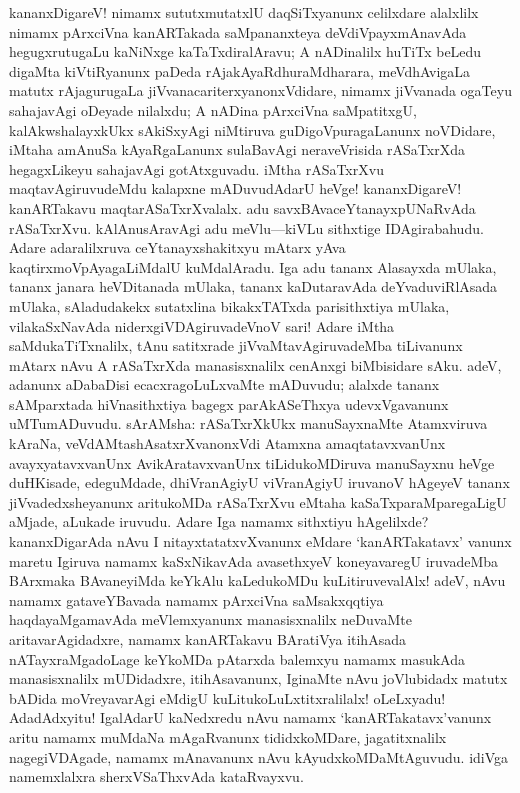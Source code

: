 \documentclass[11pt,a4size]{article}
\begin{document}
kananxDigareV! nimamx sututxmutatxlU daqSiTxyanunx celilxdare
alalxlilx nimamx pArxciVna kanARTakada saMpananxteya
deVdiVpayxmAnavAda hegugxrutugaLu kaNiNxge kaTaTxdiralAravu; A
nADinalilx huTiTx beLedu digaMta kiVtiRyanunx paDeda
rAjakAyaRdhuraMdharara, meVdhAvigaLa matutx rAjagurugaLa
jiVvanacariterxyanonxVdidare, nimamx jiVvanada ogaTeyu sahajavAgi
oDeyade nilalxdu; A nADina pArxciVna saMpatitxgU, kalAkwshalayxkUkx
sAkiSxyAgi niMtiruva guDigoVpuragaLanunx noVDidare, iMtaha amAnuSa
kAyaRgaLanunx sulaBavAgi neraveVrisida rASaTxrXda hegagxLikeyu
sahajavAgi gotAtxguvadu. iMtha rASaTxrXvu maqtavAgiruvudeMdu kalapxne
mADuvudAdarU heVge! kananxDigareV! kanARTakavu
maqtarASaTxrXvalalx. adu savxBAvaceYtanayxpUNaRvAda
rASaTxrXvu. kAlAnusAravAgi adu meVlu---kiVLu sithxtige
IDAgirabahudu. Adare adaralilxruva ceYtanayxshakitxyu mAtarx yAva
kaqtirxmoVpAyagaLiMdalU kuMdalAradu. Iga adu tananx Alasayxda mUlaka,
tananx janara heVDitanada mUlaka, tananx kaDutaravAda deYvaduviRlAsada
mUlaka, sAladudakekx sutatxlina bikakxTATxda parisithxtiya mUlaka,
vilakaSxNavAda niderxgiVDAgiruvadeVnoV sari! Adare iMtha
saMdukaTiTxnalilx, tAnu satitxrade jiVvaMtavAgiruvadeMba tiLivanunx
mAtarx nAvu A rASaTxrXda manasisxnalilx cenAnxgi biMbisidare
sAku. adeV, adanunx aDabaDisi ecacxragoLuLxvaMte mADuvudu; alalxde
tananx sAMparxtada hiVnasithxtiya bagegx parAkASeThxya udevxVgavanunx
uMTumADuvudu. sArAMsha: rASaTxrXkUkx manuSayxnaMte Atamxviruva kAraNa,
veVdAMtashAsatxrXvanonxVdi Atamxna amaqtatavxvanUnx avayxyatavxvanUnx
AvikAratavxvanUnx tiLidukoMDiruva manuSayxnu heVge duHKisade,
edeguMdade, dhiVranAgiyU viVranAgiyU iruvanoV hAgeyeV tananx
jiVvadedxsheyanunx aritukoMDa rASaTxrXvu eMtaha kaSaTxparaMparegaLigU
aMjade, aLukade iruvudu. Adare Iga namamx sithxtiyu hAgelilxde?
kananxDigarAda nAvu I nitayxtatatxvXvanunx eMdare `kanARTakatavx'
vanunx maretu Igiruva namamx kaSxNikavAda avasethxyeV koneyavaregU
iruvadeMba BArxmaka BAvaneyiMda keYkAlu kaLedukoMDu kuLitiruvevalAlx!
adeV, nAvu namamx gataveYBavada namamx pArxciVna saMsakxqqtiya
haqdayaMgamavAda meVlemxyanunx manasisxnalilx neDuvaMte
aritavarAgidadxre, namamx kanARTakavu BAratiVya itihAsada
nATayxraMgadoLage keYkoMDa pAtarxda balemxyu namamx masukAda
manasisxnalilx mUDidadxre, itihAsavanunx, IginaMte nAvu joVlubidadx
matutx bADida moVreyavarAgi eMdigU kuLitukoLuLxtitxralilalx!
oLeLxyadu! AdadAdxyitu! IgalAdarU kaNedxredu nAvu namamx
`kanARTakatavx'vanunx aritu namamx muMdaNa mAgaRvanunx tididxkoMDare,
jagatitxnalilx nagegiVDAgade, namamx mAnavanunx nAvu
kAyudxkoMDaMtAguvudu. idiVga namemxlalxra sherxVSaThxvAda kataRvayxvu.
\end{document}
